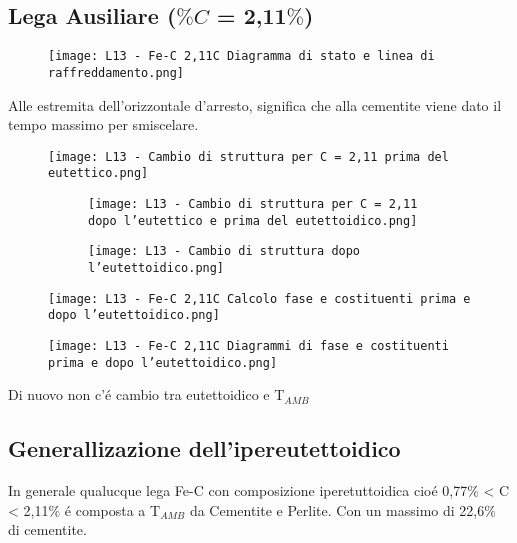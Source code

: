 \documentclass{article}
\begin{document}
{        \subsection{Lega Ausiliare ($\%C$ = 2,11$\%$)}
            \begin{figure}[h!]
                \centering
                \texttt{[image: L13 - Fe-C 2,11C Diagramma di stato e linea di raffreddamento.png]}
            \end{figure}
            Alle estremita dell'orizzontale d'arresto, significa che alla cementite viene dato il tempo massimo per smiscelare.\\
            \begin{figure}[h!]
                \centering
                \texttt{[image: L13 - Cambio di struttura per C = 2,11 prima del eutettico.png]}
            \end{figure}
            \begin{figure}
                \centering
                \begin{subfigure}[h!]{.6\linewidth}
                    \texttt{[image: L13 - Cambio di struttura per C = 2,11 dopo l'eutettico e prima del eutettoidico.png]}
                \end{subfigure}
                \begin{subfigure}[h!]{.3\linewidth}
                    \texttt{[image: L13 - Cambio di struttura dopo l'eutettoidico.png]}
                \end{subfigure}
            \end{figure}
            \begin{figure}[h!]
                \centering
                \texttt{[image: L13 - Fe-C 2,11C Calcolo fase e costituenti prima e dopo l'eutettoidico.png]}
            \end{figure}
            \begin{figure}[h!]
                \centering
                \texttt{[image: L13 - Fe-C 2,11C Diagrammi di fase e costituenti prima e dopo l'eutettoidico.png]}
            \end{figure}
        \newpage
            Di nuovo non c'\'e cambio tra eutettoidico e T$_{AMB}$\\
        \newpage
        \subsection{Generallizazione dell'ipereutettoidico}
            In generale qualucque lega Fe-C con composizione iperetuttoidica cio\'e 0,77$\%$ < C < 2,11$\%$ \'e composta a T$_{AMB}$ da Cementite e Perlite. Con un massimo di 22,6$\%$ di cementite.   
    
}
\end{document}

